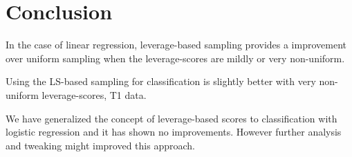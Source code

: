 \documentclass{article}
\begin{document}
\section{Conclusion}
In the case of linear regression, leverage-based sampling provides a improvement over uniform sampling when the leverage-scores are mildly or very non-uniform.

Using the LS-based sampling for classification is slightly better with very non-uniform leverage-scores, T1 data.

We have generalized the concept of leverage-based scores to classification with logistic regression and it has shown no improvements. However further analysis and tweaking might improved this approach.




\end{document}

